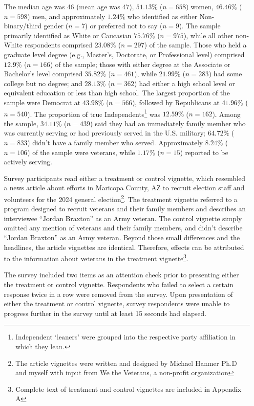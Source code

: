 \documentclass[
  12pt,
  letterpaper,
]{article}
\begin{document}
The median age was \(46\) (mean age was \(47\)), \(51.13\%\)
(\(n = 658\)) women, \(46.46\%\) (\(n = 598\)) men, and approximately
\(1.24\%\) who identified as either Non-binary/third gender (\(n = 7\))
or preferred not to say (\(n = 9\)). The sample primarily identified as
White or Caucasian \(75.76\%\) (\(n = 975\)), while all other non-White
respondents comprised \(23.08\%\) (\(n = 297\)) of the sample. Those who
held a graduate level degree (e.g., Master's, Doctorate, or Professional
level) comprised \(12.9\%\) (\(n = 166\)) of the sample; those with
either degree at the Associate or Bachelor's level comprised \(35.82\%\)
(\(n = 461\)), while \(21.99\%\) (\(n = 283\)) had some college but no
degree; and \(28.13\%\) (\(n = 362\)) had either a high school level or
equivalent education or less than high school. The largest proportion of
the sample were Democrat at \(43.98\%\) (\(n = 566\)), followed by
Republicans at \(41.96\%\) (\(n = 540\)). The proportion of true
Independents\footnote{Independent `leaners' were grouped into the
  respective party affiliation in which they lean.} was \(12.59\%\)
(\(n = 162\)). Among the sample, \(34.11\%\) (\(n = 439\)) said they had
an immediately family member who was currently serving or had previously
served in the U.S. military; \(64.72\%\) (\(n = 833\)) didn't have a
family member who served. Approximately \(8.24\%\) (\(n = 106\)) of the
sample were veterans, while \(1.17\%\) (\(n = 15\)) reported to be
actively serving.

Survey participants read either a treatment or control vignette, which
resembled a news article about efforts in Maricopa County, AZ to recruit
election staff and volunteers for the 2024 general election\footnote{The
  article vignettes were written and designed by Michael Hanmer Ph.D and
  myself with input from We the Veterans, a non-profit organization}.
The treatment vignette referred to a program designed to recruit
veterans and their family members and describes an interviewee ``Jordan
Braxton'' as an Army veteran. The control vignette simply omitted any
mention of veterans and their family members, and didn't describe
``Jordan Braxton'' as an Army veteran. Beyond those small differences
and the headlines, the article vignettes are identical. Therefore,
effects can be attributed to the information about veterans in the
treatment vignette\footnote{Complete text of treatment and control
  vignettes are included in Appendix A}.

The survey included two items as an attention check prior to presenting
either the treatment or control vignette. Respondents who failed to
select a certain response twice in a row were removed from the survey.
Upon presentation of either the treatment or control vignette, survey
respondents were unable to progress further in the survey until at least
15 seconds had elapsed.
\end{document}
